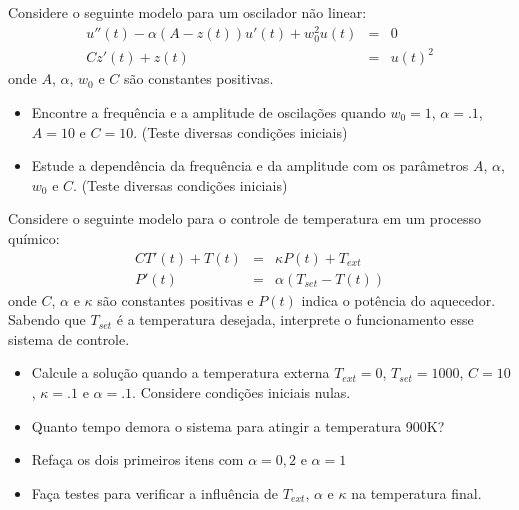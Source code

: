 \begin{exer} Considere o seguinte modelo para um oscilador não linear:
\begin{eqnarray*}
u''(t)-\alpha(A-z(t))u'(t)+w_0^2 u(t)&=&0\\
Cz'(t)+z(t)&=&u(t)^2
\end{eqnarray*}
onde $A$, $\alpha$, $w_0$ e $C$ são constantes positivas.
\begin{itemize}
\item Encontre a frequência e a amplitude de oscilações quando $w_0=1$, $\alpha=.1$, $A=10$ e $C=10$. (Teste diversas condições iniciais)
\item Estude a dependência da frequência e da amplitude com os parâmetros  $A$, $\alpha$, $w_0$ e $C$. (Teste diversas condições iniciais)
\end{itemize}
\end{exer}

\begin{exer} Considere o seguinte modelo para o controle de temperatura em um processo químico:
\begin{eqnarray*}
CT'(t)+T(t)&=&\kappa P(t)+T_{ext}\\
P'(t)&=&\alpha(T_{set}-T(t))
\end{eqnarray*}
onde $C$, $\alpha$ e $\kappa$ são constantes positivas e $P(t)$ indica o potência do aquecedor. Sabendo que $T_{set}$ é a temperatura desejada, interprete o funcionamento esse sistema de controle.
\begin{itemize}
\item Calcule a solução quando a temperatura externa $T_{ext}=0$, $T_{set}=1000$, $C=10$, $\kappa=.1$ e $\alpha=.1$. Considere condições iniciais nulas.
\item Quanto tempo demora o sistema para atingir a temperatura 900K?
\item Refaça os dois primeiros itens com $\alpha=0,2$ e $\alpha=1$
\item Faça testes para verificar a influência de $T_{ext}$, $\alpha$ e $\kappa$ na temperatura final.
\end{itemize}
\end{exer}


